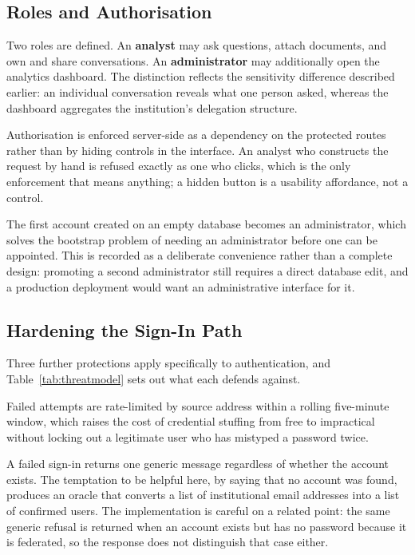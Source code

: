 \subsection{Roles and Authorisation}

Two roles are defined. An \textbf{analyst} may ask questions, attach documents, and own and
share conversations. An \textbf{administrator} may additionally open the analytics dashboard.
The distinction reflects the sensitivity difference described earlier: an individual
conversation reveals what one person asked, whereas the dashboard aggregates the institution's
delegation structure.

Authorisation is enforced server-side as a dependency on the protected routes rather than by
hiding controls in the interface. An analyst who constructs the request by hand is refused
exactly as one who clicks, which is the only enforcement that means anything; a hidden button
is a usability affordance, not a control.

The first account created on an empty database becomes an administrator, which solves the
bootstrap problem of needing an administrator before one can be appointed. This is recorded as
a deliberate convenience rather than a complete design: promoting a second administrator still
requires a direct database edit, and a production deployment would want an administrative
interface for it.

\subsection{Hardening the Sign-In Path}

Three further protections apply specifically to authentication, and
Table~\ref{tab:threatmodel} sets out what each defends against.

Failed attempts are rate-limited by source address within a rolling five-minute window, which
raises the cost of credential stuffing from free to impractical without locking out a
legitimate user who has mistyped a password twice.

A failed sign-in returns one generic message regardless of whether the account exists. The
temptation to be helpful here, by saying that no account was found, produces an oracle that
converts a list of institutional email addresses into a list of confirmed users. The
implementation is careful on a related point: the same generic refusal is returned when an
account exists but has no password because it is federated, so the response does not
distinguish that case either.

